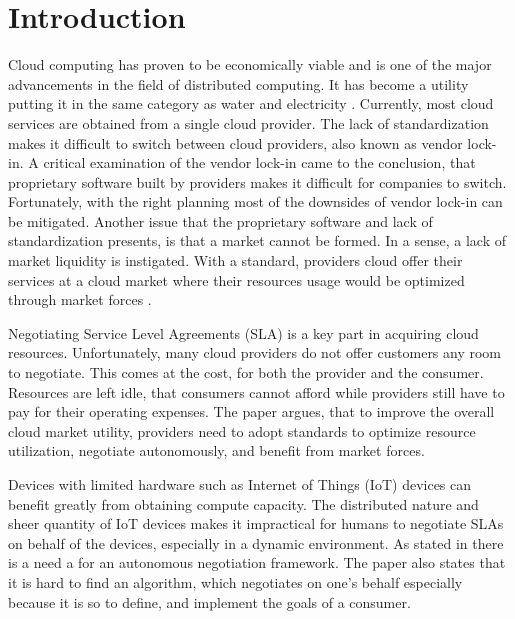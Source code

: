 \chapter{Introduction}



Cloud computing has proven to be economically viable and is one of the major advancements in the field of distributed computing. It has become a utility putting it in the same category as water and electricity \cite{buyya2009cloud}. Currently, most cloud services are obtained from a single cloud provider. The lack of standardization makes it difficult to switch between cloud providers, also known as vendor lock-in. A critical examination of the vendor lock-in \cite{vendorlockin} came to the conclusion, that proprietary software built by providers makes it difficult for companies to switch. Fortunately, with the right planning most of the downsides of vendor lock-in can be mitigated. Another issue that the proprietary software and lack of standardization presents, is that a market cannot be formed. In a sense, a lack of market liquidity is instigated. With a standard, providers cloud offer their services at a cloud market where their resources usage would be optimized through market forces \cite{autonomous-agent, Dastjerdi2015AnAT}.


Negotiating Service Level Agreements (SLA) is a key part in acquiring cloud resources. Unfortunately, many cloud providers do not offer customers any room to negotiate. This comes at the cost, for both the provider and the consumer. Resources are left idle, that consumers cannot afford while providers still have to pay for their operating expenses. The paper \cite{Dastjerdi2015AnAT} argues, that to improve the overall cloud market utility, providers need to adopt standards to optimize resource utilization, negotiate autonomously, and benefit from market forces.

Devices with limited hardware such as Internet of Things (IoT) devices can benefit greatly from obtaining compute capacity. The distributed nature and sheer quantity of IoT devices makes it impractical for humans to negotiate SLAs on behalf of the devices, especially in a dynamic environment. As stated in \cite{autonomous-agent} there is a need a for an autonomous negotiation framework. The paper also states that it is hard to find an algorithm, which negotiates on one's behalf especially because it is so to define, and implement the goals of a consumer.

